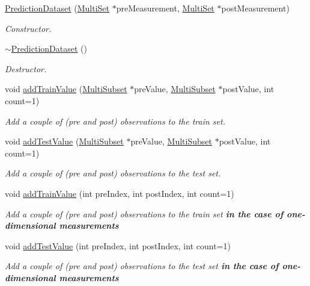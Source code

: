 \begin{DoxyCompactItemize}
\item 
\hyperlink{classPredictionDataset_a5a2d75a4affa2b76dbb631f2f79c217e}{Prediction\-Dataset} (\hyperlink{classMultiSet}{Multi\-Set} $\ast$pre\-Measurement, \hyperlink{classMultiSet}{Multi\-Set} $\ast$post\-Measurement)
\begin{DoxyCompactList}\small\item\em Constructor. \end{DoxyCompactList}\item 
\hypertarget{classPredictionDataset_a9a30fa528fa4a2507a1a0a5fe8c74269}{\hyperlink{classPredictionDataset_a9a30fa528fa4a2507a1a0a5fe8c74269}{$\sim$\-Prediction\-Dataset} ()}\label{classPredictionDataset_a9a30fa528fa4a2507a1a0a5fe8c74269}

\begin{DoxyCompactList}\small\item\em Destructor. \end{DoxyCompactList}\item 
void \hyperlink{classPredictionDataset_ae2d6c192122c2f9f7a1b3232b486d86c}{add\-Train\-Value} (\hyperlink{classMultiSubset}{Multi\-Subset} $\ast$pre\-Value, \hyperlink{classMultiSubset}{Multi\-Subset} $\ast$post\-Value, int count=1)
\begin{DoxyCompactList}\small\item\em Add a couple of (pre and post) observations to the train set. \end{DoxyCompactList}\item 
void \hyperlink{classPredictionDataset_a097fc45e897544af6b5215a26fa41527}{add\-Test\-Value} (\hyperlink{classMultiSubset}{Multi\-Subset} $\ast$pre\-Value, \hyperlink{classMultiSubset}{Multi\-Subset} $\ast$post\-Value, int count=1)
\begin{DoxyCompactList}\small\item\em Add a couple of (pre and post) observations to the test set. \end{DoxyCompactList}\item 
void \hyperlink{classPredictionDataset_a9615dd7ab9f8dd04fb2fb28d68bd96b1}{add\-Train\-Value} (int pre\-Index, int post\-Index, int count=1)
\begin{DoxyCompactList}\small\item\em Add a couple of (pre and post) observations to the train set {\bfseries in the case of one-\/dimensional measurements} \end{DoxyCompactList}\item 
void \hyperlink{classPredictionDataset_a8298f94fac0d5b3761effdb20405417a}{add\-Test\-Value} (int pre\-Index, int post\-Index, int count=1)
\begin{DoxyCompactList}\small\item\em Add a couple of (pre and post) observations to the test set {\bfseries in the case of one-\/dimensional measurements} \end{DoxyCompactList}\end{DoxyCompactItemize}
